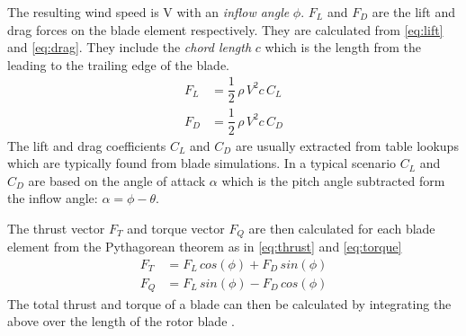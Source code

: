 The resulting wind speed is V with an \textit{inflow angle} $ \phi $. $ F_L $ and $ F_D $ are the lift and drag forces on the blade element respectively. They are calculated from \cref{eq:lift} and \cref{eq:drag}. They include the \textit{chord length} $ c $ which is the length from the leading to the trailing edge of the blade.
\begin{align}
	F_L &= \dfrac{1}{2}\,  \rho \, V^2 c \, C_L \label{eq:lift}\\
	F_D &= \dfrac{1}{2} \, \rho \, V^2 c \, C_D \label{eq:drag}
\end{align}
The lift and drag coefficients $ C_L $ and $ C_D $ are usually extracted from table lookups which are typically found from blade simulations. In a typical scenario $ C_L $ and $ C_D $ are based on the angle of attack $ \alpha $ which is the pitch angle subtracted form the inflow angle: $ \alpha = \phi - \theta $.

The thrust vector $ F_T $ and torque vector $ F_Q $ are then calculated for each blade element from the Pythagorean theorem as in \cref{eq:thrust} and \cref{eq:torque}
\begin{align}
	F_T &= F_L \, cos(\phi) + F_D \, sin(\phi) \label{eq:thrust} \\
	F_Q &= F_L \, sin(\phi) - F_D \, cos(\phi) \label{eq:torque}
\end{align}
The total thrust and torque of a blade can then be calculated by integrating the above over the length of the rotor blade \cite{Knudsen2013}.


